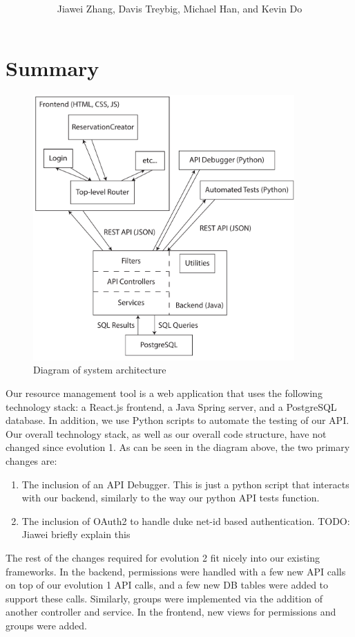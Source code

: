 \documentclass[12pt]{article}
\title{\horrule{5pt}\\\vspace{0.4cm}{\bf \mytitle}\\}
\author{Jiawei Zhang, Davis Treybig, Michael Han, and Kevin Do}
\date{\horrule{1pt}}
\begin{document}
\maketitle{}
\section{Summary}
\begin{figure}[h]
\begin{center}
\includegraphics[height=4in]{ev2_design_cropped.pdf}
\end{center}
\caption{Diagram of system architecture}
\label{fig:design}
\end{figure}

Our resource management tool is a web application that uses the following technology stack: a React.js frontend, a Java Spring server, and a PostgreSQL database. In addition, we use Python scripts to automate the testing of our API. Our overall technology stack, as well as our overall code structure, have not changed since evolution 1. As can be seen in the diagram above, the two primary changes are:
\begin{enumerate}
    \item The inclusion of an API Debugger. This is just a python script that interacts with our backend, similarly to the way our python API tests function. 
    \item The inclusion of OAuth2 to handle duke net-id based authentication. TODO: Jiawei briefly explain this
\end{enumerate}

The rest of the changes required for evolution 2 fit nicely into our existing frameworks. In the backend, permissions were handled with a few new API calls on top of our evolution 1 API calls, and a few new DB tables were added to support these calls. Similarly, groups were implemented via the addition of another controller and service. In the frontend, new views for permissions and groups were added.  
\end{document}
